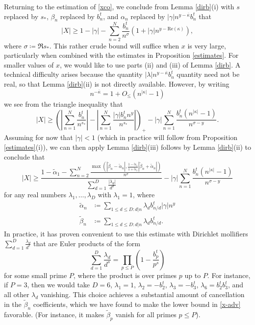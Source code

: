 Returning to the estimation of \eqref{xco}, we conclude from Lemma \ref{dirb}(i) with $s$ replaced by $s_*$, $\beta_n$ replaced by $b_n^t$, and $\alpha_n$ replaced by $|\gamma| n^{y-\overline{\kappa}} b_n^t$ that
\begin{equation}\label{x-init}
|X| \geq 1 - |\gamma| - \sum_{n=2}^N \frac{b_n^t}{n^\sigma} (1 + |\gamma| n^{y - \mathrm{Re}(\kappa)}),
\end{equation}
where $\sigma \coloneqq \Re s_*$.  This rather crude bound will suffice when $x$ is very large, particularly when combined with the estimates in Proposition \ref{estimates}.   For smaller values of $x$, we would like to use parts (ii) and (iii) of Lemma \ref{dirb}.  A technical difficulty arises because the quantity $|\lambda| n^{y-\overline{\kappa}} b_n^t$ quantity need not be real, so that Lemma \ref{dirb}(ii) is not directly available.  However, by writing
$$ n^{-\overline{\kappa}} = 1 + O_{\leq}( n^{|\kappa|} - 1 )$$
we see from the triangle inequality that
$$ |X| \geq \left( \left| \sum_{n=1}^N \frac{b_n^t}{n^{s_*}}\right| - \left| \sum_{n=1}^N \frac{|\gamma| b_n^t n^y}{n^{s_*}}\right| \right)_+
- |\gamma| \sum_{n=1}^N \frac{b_n^t (n^{|\kappa|} - 1)}{n^{\sigma-y}}.$$
Assuming for now that $|\gamma| < 1$ (which in practice will follow from Proposition \ref{estimates}(i)), we can then apply Lemma \ref{dirb}(iii) follows by Lemma \ref{dirb}(ii) to conclude that
\begin{equation}\label{x-adv}
|X| \geq \frac{1 - \tilde \alpha_1 - \sum_{n=2}^N \frac{\max( |\tilde \beta_n-\tilde \alpha_n|, \frac{1-\tilde \alpha_1}{1+\tilde \alpha_1} |\tilde \beta_n+\tilde \alpha_n|)}{n^\sigma}}{\sum_{d=1}^D \frac{|\lambda_d|}{d^\sigma}} - |\gamma| \sum_{n=1}^N \frac{b_n^t (n^{|\kappa|} - 1)}{n^{\sigma-y}}
\end{equation}
for any real numbers $\lambda_1,\dots,\lambda_D$ with $\lambda_1 = 1$, where
\begin{align*}
\tilde \alpha_n &\coloneqq \sum_{1 \leq d \leq D: d|n} \lambda_d b_{n/d}^t |\gamma| n^y \\
\tilde \beta_n &\coloneqq \sum_{1 \leq d \leq D: d|n} \lambda_d b_{n/d}^t.
\end{align*}
In practice, it has proven convenient to use this estimate with Dirichlet mollifiers $\sum_{d=1}^D \frac{\lambda_d}{d^s}$ that are Euler products of the form
$$ \sum_{d=1}^D \frac{\lambda_d}{d^s} = \prod_{p \leq P} \left( 1 - \frac{b_p^t}{p^s} \right)$$
for some small prime $P$, where the product is over primes $p$ up to $P$.  For instance, if $P = 3$, then we would take $D=6$, $\lambda_1 = 1$, $\lambda_2 = - b_2^t$, $\lambda_3 = -b_3^t$, $\lambda_6 = b_2^t b_3^t$, and all other $\lambda_d$ vanishing.  This choice achieves a substantial amount of cancellation in the $\tilde \beta_n$ coefficients, which we have found to make the lower bound in \eqref{x-adv} favorable.  (For instance, it makes $\tilde \beta_p$ vanish for all primes $p \leq P$).
